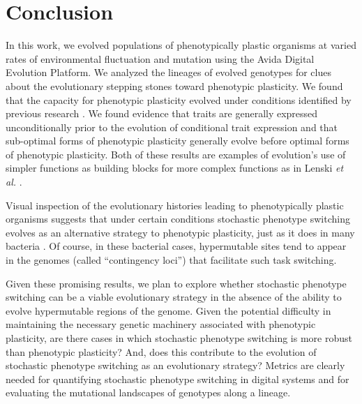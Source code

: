 \section{Conclusion}

In this work, we evolved populations of phenotypically plastic organisms at varied rates of environmental fluctuation and mutation using the Avida Digital Evolution Platform. 
We analyzed the lineages of evolved genotypes for clues about the evolutionary stepping stones toward phenotypic plasticity. 
We found that the capacity for phenotypic plasticity evolved under conditions identified by previous research \citep{clune_investigating_2007,ghalambor_behavior_2010}. 
We found evidence that traits are generally expressed unconditionally prior to the evolution of conditional trait expression and that sub-optimal forms of phenotypic plasticity generally evolve before optimal forms of phenotypic plasticity. 
Both of these results are examples of evolution's use of simpler functions as building blocks for more complex functions as in Lenski \textit{et al.} \citep{lenski_evolutionary_2003}. 

Visual inspection of the evolutionary histories leading to phenotypically plastic organisms suggests that under certain conditions stochastic phenotype switching evolves as an alternative strategy to phenotypic plasticity, just as it does in many bacteria \citep{moxon_bacterial_2006,rainey_evolutionary_2011}.  
Of course, in these bacterial cases, hypermutable sites tend to appear in the genomes (called ``contingency loci'') that facilitate such task switching.

Given these promising results, we plan to explore whether stochastic phenotype switching can be a viable evolutionary strategy in the absence of the ability to evolve hypermutable regions of the genome. 
Given the potential difficulty in maintaining the necessary genetic machinery associated with phenotypic plasticity, are there cases in which stochastic phenotype switching is more robust than phenotypic plasticity? 
And, does this contribute to the evolution of stochastic phenotype switching as an evolutionary strategy? 
Metrics are clearly needed for quantifying stochastic phenotype switching in digital systems and for evaluating the mutational landscapes of genotypes along a lineage. 